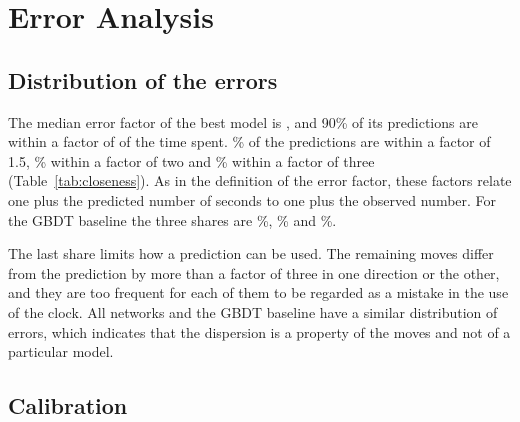 \documentclass[11pt]{article}
\begin{document}
\section{Error Analysis}
\label{sec:error}



\iflook
\subsection{Distribution of the errors}

The median error factor of the best model is , and 90\%
of its predictions are within a factor of  of the time
spent. \% of the predictions are within a factor of
1.5, \% within a factor of two and
\% within a factor of three
(Table~\ref{tab:closeness}). As in the definition of the error factor, these
factors relate one plus the predicted number of seconds to one plus the
observed number. For the GBDT baseline the three shares are
\%, \% and
\%.

\begin{table}[htbp]\centering\small
{}
\caption{Distribution of the errors on the test set: the median error factor,
the 90th percentile, and the share of predictions within a factor of 1.5, two
and three of the time spent.}
\label{tab:closeness}
\end{table}

The last share limits how a prediction can be used. The remaining moves
differ from the prediction by more than a factor of three in one direction or
the other, and they are too frequent for each of them to be regarded as a
mistake in the use of the clock. All networks and the GBDT baseline have a
similar distribution of errors, which indicates that the dispersion is a
property of the moves and not of a particular model.

\subsection{Calibration}
\end{document}
